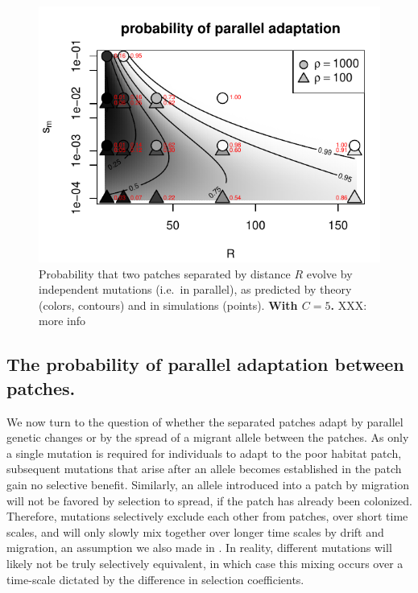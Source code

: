 \documentclass{article}
\newcommand{\citep}[1]{\cite{#1}}
\begin{document}
\begin{figure}[ht!]
  \begin{center}
      \includegraphics{prob-mutation-compared}
  \end{center}
  \caption{
      Probability that two patches separated by distance $R$
      evolve by independent mutations (i.e.\ in parallel),
      as predicted by theory (colors, contours)
      and in simulations (points).
      \textbf{With $C=5$.}
      XXX: more info
  }   \label{fig:sim_probs}
\end{figure}




\subsection[Probability of Parallel Adaptation]{The probability of parallel adaptation between patches.} 
\label{ss:probparallel}

We now turn to the question of whether the separated patches adapt by parallel genetic changes 
or by the spread of a migrant allele between the patches.
As only a single mutation is required for individuals to adapt to the
poor habitat patch, subsequent mutations that arise after an allele becomes established in the patch gain no selective benefit. 
Similarly, an allele introduced into a patch by migration will not be favored by selection to spread, 
if the patch has already been colonized. 
Therefore, mutations selectively exclude each other from patches, over short time scales, 
and will only slowly mix together over longer time scales by drift and migration,
an assumption we also made in \citep{ralph2010parallel}. 
In reality, different mutations will likely not be truly selectively equivalent,
in which case this mixing occurs over a time-scale dictated by the difference in selection coefficients.
\end{document}
